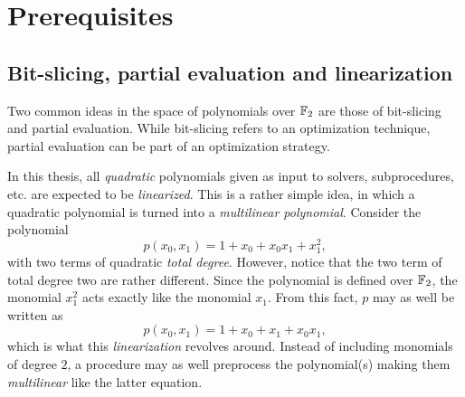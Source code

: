 \section{Prerequisites} \label{sec:prereq}

\subsection{Bit-slicing, partial evaluation and linearization}
Two common ideas in the space of polynomials over $\mathbb{F}_2$ are those of bit-slicing and partial evaluation. While bit-slicing refers to an optimization technique, partial evaluation can be part of an optimization strategy.

In this thesis, all \textit{quadratic} polynomials given as input to solvers, subprocedures, etc. are expected to be \textit{linearized}. This is a rather simple idea, in which a quadratic polynomial is turned into a \textit{multilinear polynomial}. Consider the polynomial
$$
    p(x_0, x_1) = 1 + x_0 + x_0x_1 + x_1^2, 
$$
with two terms of quadratic \textit{total degree}. However, notice that the two term of total degree two are rather different. Since the polynomial is defined over $\mathbb{F}_2$, the monomial $x_1^2$ acts exactly like the monomial $x_1$. From this fact, $p$ may as well be written as 
$$
    p(x_0, x_1) = 1 + x_0 + x_1 + x_0x_1,
$$
which is what this \textit{linearization} revolves around. Instead of including monomials of degree $2$, a procedure may as well preprocess the polynomial(s) making them \textit{multilinear} like the latter equation.

